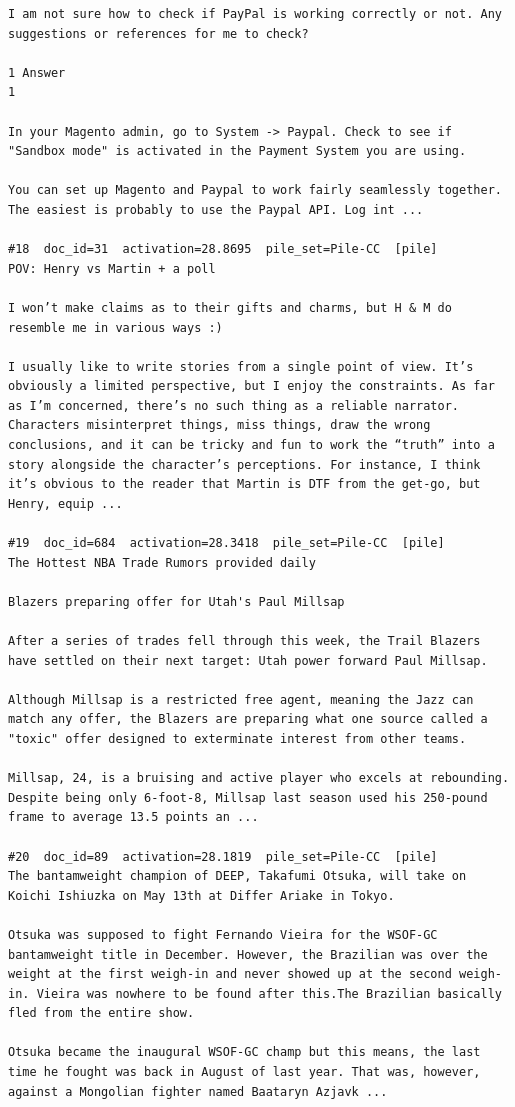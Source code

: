 \begin{verbatim}
I am not sure how to check if PayPal is working correctly or not. Any suggestions or references for me to check?

1 Answer
1

In your Magento admin, go to System -> Paypal. Check to see if "Sandbox mode" is activated in the Payment System you are using.

You can set up Magento and Paypal to work fairly seamlessly together. The easiest is probably to use the Paypal API. Log int ...

#18  doc_id=31  activation=28.8695  pile_set=Pile-CC  [pile]
POV: Henry vs Martin + a poll

I won’t make claims as to their gifts and charms, but H & M do resemble me in various ways :)

I usually like to write stories from a single point of view. It’s obviously a limited perspective, but I enjoy the constraints. As far as I’m concerned, there’s no such thing as a reliable narrator. Characters misinterpret things, miss things, draw the wrong conclusions, and it can be tricky and fun to work the “truth” into a story alongside the character’s perceptions. For instance, I think it’s obvious to the reader that Martin is DTF from the get-go, but Henry, equip ...

#19  doc_id=684  activation=28.3418  pile_set=Pile-CC  [pile]
The Hottest NBA Trade Rumors provided daily

Blazers preparing offer for Utah's Paul Millsap

After a series of trades fell through this week, the Trail Blazers have settled on their next target: Utah power forward Paul Millsap.

Although Millsap is a restricted free agent, meaning the Jazz can match any offer, the Blazers are preparing what one source called a "toxic" offer designed to exterminate interest from other teams.

Millsap, 24, is a bruising and active player who excels at rebounding. Despite being only 6-foot-8, Millsap last season used his 250-pound frame to average 13.5 points an ...

#20  doc_id=89  activation=28.1819  pile_set=Pile-CC  [pile]
The bantamweight champion of DEEP, Takafumi Otsuka, will take on Koichi Ishiuzka on May 13th at Differ Ariake in Tokyo.

Otsuka was supposed to fight Fernando Vieira for the WSOF-GC bantamweight title in December. However, the Brazilian was over the weight at the first weigh-in and never showed up at the second weigh-in. Vieira was nowhere to be found after this.The Brazilian basically fled from the entire show.

Otsuka became the inaugural WSOF-GC champ but this means, the last time he fought was back in August of last year. That was, however, against a Mongolian fighter named Baataryn Azjavk ...

\end{verbatim}

